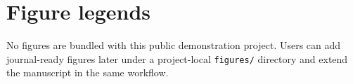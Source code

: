 \section{Figure legends}
No figures are bundled with this public demonstration project. Users can
add journal-ready figures later under a project-local \texttt{figures/}
directory and extend the manuscript in the same workflow.
